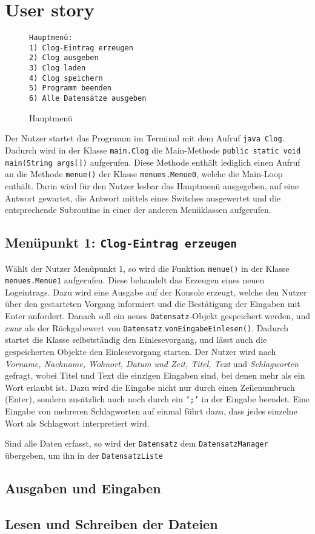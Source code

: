 \documentclass[oneside,12pt]{scrartcl}
\newcommand{\code}[1]{\textcolor{Firebrick4}{\bcode{#1}}}
\newcommand{\class}[1]{\textcolor{Green4}{\bcode{#1}}}
\newcommand{\method}[1]{\textcolor{Orange3}{\bcode{#1()}}}
\newcommand{\methodcall}[2]{\class{#1}.\method{#2}}
\newcommand{\bcode}[1]{\texttt{#1}}
\newcommand{\emphasize}[1]{\textsl{#1}}
\begin{document}
\section{User story}
\begin{wrapfigure}{r}{0.4\textwidth}
\vspace{-10pt}
\begin{verbatim}
Hauptmenü:
1) Clog-Eintrag erzeugen
2) Clog ausgeben
3) Clog laden
4) Clog speichern
5) Programm beenden
6) Alle Datensätze ausgeben
\end{verbatim}
\vspace{-10pt}
\caption{Hauptmenü}
\end{wrapfigure}
Der Nutzer startet das Programm im Terminal mit dem Aufruf \code{java Clog}. Dadurch wird in der Klasse \code{main.Clog} die Main-Methode \code{public static void main(String args[])} aufgerufen. Diese Methode enthält lediglich einen Aufruf an die Methode \code{menue()} der Klasse \code{menues.Menue0}, welche die Main-Loop enthält. Darin wird für den Nutzer lesbar das Hauptmenü ausgegeben, auf eine Antwort gewartet, die Antwort mittels eines Switches ausgewertet und die entsprechende Subroutine in einer der anderen Menüklassen aufgerufen. 

\subsection{Menüpunkt 1: \code{Clog-Eintrag erzeugen}}
Wählt der Nutzer Menüpunkt 1, so wird die Funktion \code{menue()} in der Klasse \code{menues.Menue1} aufgerufen. Diese behandelt das Erzeugen eines neuen Logeintrags. Dazu wird eine Ausgabe auf der Konsole erzeugt, welche den Nutzer über den gestarteten Vorgang informiert und die Bestätigung der Eingaben mit Enter anfordert. Danach soll ein neues \class{Datensatz}-Objekt gespeichert werden, und zwar als der Rückgabewert von \methodcall{Datensatz}{vonEingabeEinlesen}. Dadurch startet die Klasse selbstständig den Einlesevorgang, und lässt auch die gespeicherten Objekte den Einlesevorgang starten. Der Nutzer wird nach \emphasize{Vorname, Nachname, Wohnort, Datum und Zeit, Titel, Text} und \emphasize{Schlagworten} gefragt, wobei Titel und Text die einzigen Eingaben sind, bei denen mehr als ein Wort erlaubt ist. Dazu wird die Eingabe nicht nur durch einen Zeilenumbruch (Enter), sondern zusätzlich auch noch durch ein \code{';'} in der Eingabe beendet. Eine Eingabe von mehreren Schlagworten auf einmal führt dazu, dass jedes einzelne Wort als Schlagwort interpretiert wird.

Sind alle Daten erfasst, so wird der \class{Datensatz} dem \class{DatensatzManager} übergeben, um ihn in der \class{DatensatzListe}

\subsection{Ausgaben und Eingaben}

\subsection{Lesen und Schreiben der Dateien}
\end{document}
